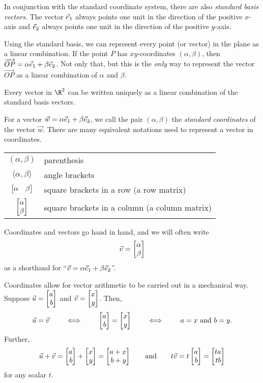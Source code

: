 In conjunction with the standard coordinate system, there are also \emph{standard basis vectors}.
The vector ${\vec e_1}$ always points one unit in the direction of the positive $x$-axis and ${\vec e_2}$
always points one unit in the direction of the positive $y$-axis.

Using the standard basis, we can represent every point (or vector) in the plane 
as a linear combination. If the point $P$ has $xy$-coordinates $(\alpha,\beta)$, then
$\overrightarrow{OP}=\alpha{\vec e_1}+\beta{\vec e_2}$. Not only that, but this is the
\emph{only} way to represent the vector $\overrightarrow{OP}$ as a linear combination of
$\alpha$ and $\beta$.

\begin{emphbox}[Takeaway]
	Every vector in $\R^2$ can be written uniquely as a linear combination of the standard basis vectors.
\end{emphbox}

For a vector $\vec w=\alpha{\vec e_1}+\beta{\vec e_2}$,
we call the pair $(\alpha,\beta)$  the
\emph{standard coordinates} of the vector $\vec w$.  There
are many equivalent notations used to represent a vector in coordinates.
\begin{center}
	\begin{tabular}{c p{7cm}}
		$(\alpha,\beta)$ & parenthesis\\
		$\langle \alpha,\beta\rangle$ & angle brackets\\
		$\mat{\alpha&\beta}$ & square brackets in a row (a row matrix)\\
		$\mat{\alpha\\\beta}$ & square brackets in a column (a column matrix)\\
	\end{tabular}
\end{center}

Coordinates and vectors go hand in hand, and we will often write
\[
	\vec v=\mat{\alpha\\\beta}
\]
as a shorthand for ``$\vec v=\alpha{\vec e_1}+\beta{\vec e_2}$''.


Coordinates allow for vector arithmetic to be carried out in a mechanical way.
 Suppose $\vec u=\mat{a\\b}$ and $\vec v=\mat{x\\y}$.
Then,
\[
	\vec u=\vec v\qquad\iff\qquad \mat{a\\b}=\mat{x\\y}\qquad\iff\qquad a=x\text{ and }b=y.
\]
Further,
\[
	\vec u+\vec v=\mat{a\\b}+\mat{x\\y}=\mat{a+x\\b+y}\qquad\text{and}\qquad t\vec v=t\mat{a\\b}=\mat{ta\\tb}
\]
for any scalar $t$.

